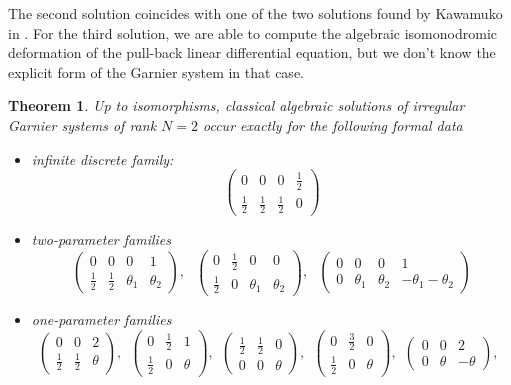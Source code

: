 \documentclass[12]{amsart}
\newtheorem{thm}{Theorem}
\begin{document}
The second solution coincides with one of the two solutions found by Kawamuko in \cite{KawamukoAlg}.
For the third solution, we are able to compute the algebraic isomonodromic deformation of the pull-back 
linear differential equation, but we don't know the explicit form of the Garnier system in that case.

\begin{thm}\label{thm:rank2classical}
Up to isomorphisms, classical algebraic solutions of irregular Garnier systems 
of rank $N=2$ occur exactly for the following formal data
\begin{itemize}
\item infinite discrete family:
$$\begin{pmatrix}0&0&0&\frac{1}{2}\\ \frac{1}{2}&\frac{1}{2}&\frac{1}{2}&0\end{pmatrix}$$
\item two-parameter families
$$\begin{pmatrix}0&0&0&1\\ \frac{1}{2}&\frac{1}{2}&\theta_1&\theta_2\end{pmatrix},\ \ \ 
\begin{pmatrix}0&\frac{1}{2}&0&0\\ \frac{1}{2}&0&\theta_1&\theta_2\end{pmatrix},\ \ \ 
\begin{pmatrix}0&0&0&1\\ 0&\theta_1&\theta_2&-\theta_1-\theta_2\end{pmatrix}$$
\item one-parameter families
$$\begin{pmatrix}0&0&2\\ \frac{1}{2}&\frac{1}{2}&\theta\end{pmatrix},\ \ 
\begin{pmatrix}0&\frac{1}{2}&1\\ \frac{1}{2}&0&\theta\end{pmatrix},\ \ 
\begin{pmatrix}\frac{1}{2}&\frac{1}{2}&0\\ 0&0&\theta\end{pmatrix},\ \
\begin{pmatrix}0&\frac{3}{2}&0\\ \frac{1}{2}&0&\theta\end{pmatrix},\ \ 
\begin{pmatrix}0&0&2\\ 0&\theta&-\theta\end{pmatrix},\ \ 
$$
\end{itemize}
\end{thm}
\end{document}
